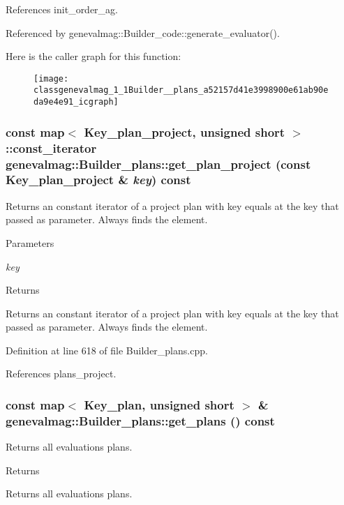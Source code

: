 References init\_\-order\_\-ag.



Referenced by genevalmag::Builder\_\-code::generate\_\-evaluator().



Here is the caller graph for this function:\nopagebreak
\begin{figure}[H]
\begin{center}
\leavevmode
\texttt{[image: classgenevalmag\_1\_1Builder\_\_plans\_a52157d41e3998900e61ab90eda9e4e91\_icgraph]}
\end{center}
\end{figure}


\hypertarget{classgenevalmag_1_1Builder__plans_a2aecc3840ac5d583959073e5d7657b34}{
\subsubsection[{get\_\-plan\_\-project}]{\setlength{\rightskip}{0pt plus 5cm}const map$<$ {\bf Key\_\-plan\_\-project}, unsigned short $>$::const\_\-iterator genevalmag::Builder\_\-plans::get\_\-plan\_\-project (const {\bf Key\_\-plan\_\-project} \& {\em key}) const}}
\label{classgenevalmag_1_1Builder__plans_a2aecc3840ac5d583959073e5d7657b34}
Returns an constant iterator of a project plan with key equals at the key that passed as parameter. Always finds the element. 
\begin{DoxyParams}{Parameters}
\item[{\em key}]\end{DoxyParams}
\begin{DoxyReturn}{Returns}

\end{DoxyReturn}
Returns an constant iterator of a project plan with key equals at the key that passed as parameter. Always finds the element. 

Definition at line 618 of file Builder\_\-plans.cpp.



References plans\_\-project.

\hypertarget{classgenevalmag_1_1Builder__plans_a75890521873bd1f8bee15799d820d755}{
\subsubsection[{get\_\-plans}]{\setlength{\rightskip}{0pt plus 5cm}const map$<$ {\bf Key\_\-plan}, unsigned short $>$ \& genevalmag::Builder\_\-plans::get\_\-plans () const}}
\label{classgenevalmag_1_1Builder__plans_a75890521873bd1f8bee15799d820d755}
Returns all evaluations plans. \begin{DoxyReturn}{Returns}

\end{DoxyReturn}
Returns all evaluations plans. 

